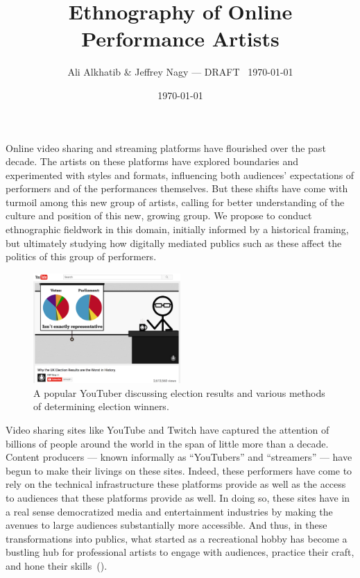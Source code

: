 \documentclass[10pt]{article}
\title{Ethnography of Online Performance Artists}
\author{Ali Alkhatib \& Jeffrey Nagy
--- DRAFT \DTMcurrenttime~\today}
\date{\today}
\makeatletter
\renewcommand{\maketitle}{\bgroup\setlength{\parindent}{0pt}
\begin{flushleft}
  {\scshape \LARGE \textbf{\@title}}

  \@author
\end{flushleft}\egroup
}
\renewenvironment{abstract}{%
\hfill\begin{minipage}{0.95\textwidth}
\itshape
}
{
\bigskip
\end{minipage}}
\makeatother
\begin{document}
  \maketitle
  \begin{abstract}
  Online video sharing and streaming platforms have flourished over the past decade.
  The artists on these platforms have
  explored boundaries and experimented with styles and formats,
  influencing both audiences' expectations of performers and of the performances themselves.
  But these shifts have come with turmoil among this new group of artists,
  calling for better understanding of the culture and position of this new, growing group.
  We propose to conduct ethnographic fieldwork in this domain,
  initially informed by a historical framing, but
  ultimately studying how digitally mediated publics such as these affect
  the politics of this group of performers.
  \end{abstract}

\begin{figure}
\centering
\includegraphics[width=0.5\textwidth]{figures/cgpgrey.png}
\caption{\label{fig:Magic}A popular YouTuber discussing election results and various methods of determining election winners.}
\end{figure}
Video sharing sites like YouTube and Twitch
have captured the attention of billions of people around the world
in the span of little more than a decade.
Content producers
--- known informally as ``YouTubers'' and ``streamers'' ---
have begun to make their livings on these sites.
Indeed, these performers have come to rely on
the technical infrastructure these platforms provide as well as
the access to audiences that these platforms provide as well.
In doing so, these sites have in a real sense democratized media and entertainment industries by
making the avenues to large audiences substantially more accessible.
And thus, in these transformations into publics, what started as
a recreational hobby
has become a bustling hub for professional artists to
engage with audiences,
practice their craft, and 
hone their skills~(\cite{Hamilton:2014:STF:2611105.2557048,Zhang:2015:CIL:2736084.2736091}).
\end{document}
